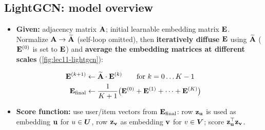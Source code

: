 \subsection{LightGCN: model overview}\label{sec:lec11-lgcn-model}

\begin{itemize}
  \item \textbf{Given:} adjacency matrix $\mathbf{A}$; initial learnable embedding
    matrix $\mathbf{E}$. Normalize $\mathbf{A}\to\widetilde{\mathbf{A}}$ (self-loop omitted), then
    \textbf{iteratively diffuse} $\mathbf{E}$ using $\widetilde{\mathbf{A}}$ ($\mathbf{E}^{(0)}$ is set to
    $\mathbf{E}$) and \textbf{average the embedding matrices at different scales}
    (\cref{fig:lec11-lightgcn}):
\end{itemize}
\begin{align}
  \mathbf{E}^{(k+1)}&\leftarrow\widetilde{\mathbf{A}}\cdot\mathbf{E}^{(k)}\qquad\text{for }k=0\dots K-1
    \label{eq:lec11-iter}\\
  \mathbf{E}_{\mathrm{final}}&\leftarrow\frac{1}{K+1}\big(\mathbf{E}^{(0)}+\mathbf{E}^{(1)}+\cdots+\mathbf{E}^{(K)}\big)
    \label{eq:lec11-final}
\end{align}
\begin{itemize}
  \item \textbf{Score function:} use user/item vectors from $\mathbf{E}_{\mathrm{final}}$: row
    $\mathbf{z}_{\mathbf{u}}$ is used as embedding $\mathbf{u}$ for $u\in\bm{U}$, row $\mathbf{z}_{\mathbf{v}}$ as
    embedding $\mathbf{v}$ for $v\in\bm{V}$; score $\mathbf{z}_{\mathbf{u}}^{\top}\mathbf{z}_{\mathbf{v}}$.
\end{itemize}

